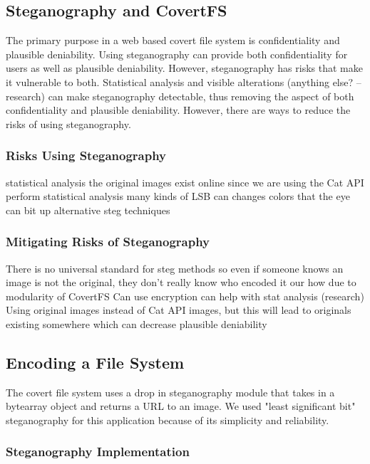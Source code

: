 \subsection{Steganography and CovertFS}
The primary purpose in a web based covert file system is confidentiality and plausible deniability. Using steganography can provide both confidentiality for users as well as plausible deniability. However, steganography has risks that make it vulnerable to both. Statistical analysis and visible alterations (anything else? -- research) can make steganography detectable, thus removing the aspect of both confidentiality and plausible deniability. However, there are ways to reduce the risks of using steganography. 

\subsubsection{Risks Using Steganography}
statistical analysis
		the original images exist online since we are using the Cat API
		perform statistical analysis
	many kinds of LSB can changes colors that the eye can bit up
	alternative steg techniques

\subsubsection{Mitigating Risks of Steganography}
There is no universal standard for steg methods
		so even if someone knows an image is not the original, they don't really know who encoded it our how due to modularity of CovertFS
	Can use encryption
		can help with stat analysis (research)
Using original images instead of Cat API images, but this will lead to originals existing somewhere which can decrease plausible deniability 

\subsection{Encoding a File System}

The covert file system uses a drop in steganography module that takes in a bytearray object and returns a URL to an image. We used "least significant bit" steganography for this application because of its simplicity and reliability.

\subsubsection{Steganography Implementation}

